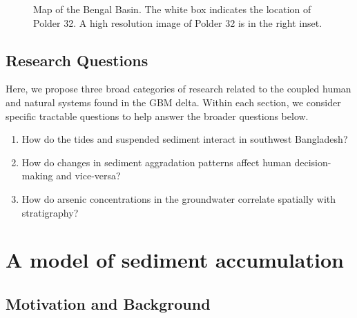 \documentclass{wscpaperproc}
\theoremstyle{wsc}
\begin{document}
\begin{figure}
	\caption[Map of the Bengal Basin]{\label{fig:map} Map of the Bengal Basin. The white box indicates the location of Polder 32. A high resolution image of Polder 32 is in the right inset.}
\end{figure}

\subsection{Research Questions}

Here, we propose three broad categories of research related to the coupled human and natural systems found in the GBM delta. Within each section, we consider specific tractable questions to help answer the broader questions below.

\begin{enumerate}
	\item How do the tides and suspended sediment interact in southwest Bangladesh?
	\item How do changes in sediment aggradation patterns affect human decision-making and vice-versa?
	\item How do arsenic concentrations in the groundwater correlate spatially with stratigraphy?
\end{enumerate}

\section{A model of sediment accumulation}

\subsection{Motivation and Background}
\end{document}
